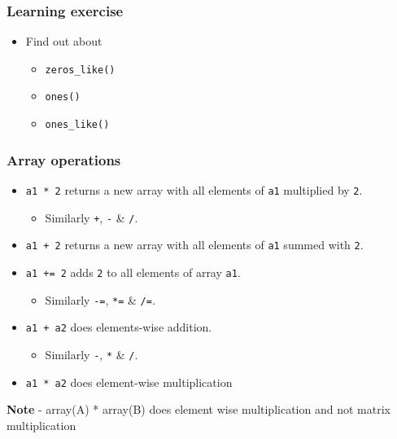 \documentclass[presentation]{beamer}
\begin{document}
\begin{frame}
\frametitle{Learning exercise}
\label{sec-13}

\begin{itemize}
\item Find out about

\begin{itemize}
\item \texttt{zeros\_like()}
\item \texttt{ones()}
\item \texttt{ones\_like()}
\end{itemize}

\end{itemize}
\end{frame}
\begin{frame}
\frametitle{Array operations}
\label{sec-14}

\begin{itemize}
\item \texttt{a1 * 2}
    returns a new array with all elements of \texttt{a1} multiplied by \texttt{2}.

\begin{itemize}
\item Similarly \texttt{+}, \texttt{-} \& \texttt{/}.
\end{itemize}

\item \texttt{a1 + 2}
    returns a new array with all elements of \texttt{a1} summed with \texttt{2}.
\item \texttt{a1 += 2}
    adds \texttt{2} to all elements of array \texttt{a1}.

\begin{itemize}
\item Similarly \texttt{-=}, \texttt{*=} \& \texttt{/=}.
\end{itemize}

\item \texttt{a1 + a2}
    does elements-wise addition.

\begin{itemize}
\item Similarly \texttt{-}, \texttt{*} \& \texttt{/}.
\end{itemize}

\item \texttt{a1 * a2}
    does element-wise multiplication
\end{itemize}


  \textbf{Note} - array(A) * array(B) does element wise multiplication and not matrix multiplication
\end{frame}
\end{document}
